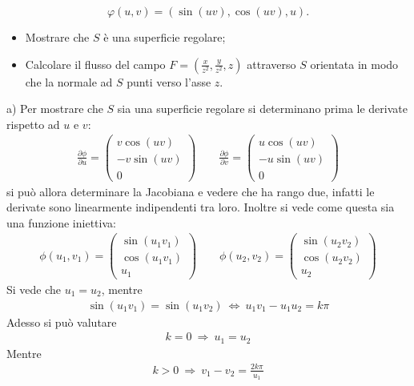 \documentclass[a4paper, oneside]{book}
\begin{document}
$$ \varphi(u,v) = (\sin(uv), \cos(uv), u). $$
\begin{itemize}
    \item[(a)] Mostrare che $S$ è una superficie regolare;
    \item[(b)] Calcolare il flusso del campo $F = \left( \frac{x}{z^2}, \frac{y}{z^2}, z \right)$ attraverso $S$ orientata in modo che la normale ad $S$ punti verso l'asse $z$.
\end{itemize}
a) Per mostrare che $S$ sia una superficie regolare si determinano prima le derivate 
rispetto ad $u$ e $v$:
\begin{gather*}
    \frac{\partial \phi}{\partial u} = \begin{pmatrix}
        v\cos(uv) \\
        -v\sin(uv) \\
        0
    \end{pmatrix} \qquad \frac{\partial \phi}{\partial v} = \begin{pmatrix}
        u\cos(uv) \\
        -u\sin(uv) \\
        0
    \end{pmatrix}  
\end{gather*}
si può allora determinare la Jacobiana e vedere che ha rango due, 
infatti le derivate sono linearmente indipendenti tra loro. Inoltre si vede
come questa sia una funzione iniettiva: 
\begin{gather*}
    \phi(u_1, v_1) = \begin{pmatrix}
        \sin(u_1v_1) \\
        \cos(u_1 v_1) \\
        u_1
    \end{pmatrix} \qquad \phi(u_2, v_2) = \begin{pmatrix}
        \sin(u_2 v_2) \\
        \cos(u_2 v_2) \\
        u_2
    \end{pmatrix}
\end{gather*}
Si vede che $u_1 = u_2$, mentre 
\begin{gather*}
    \sin(u_1 v_1) = \sin(u_1 v_2) \ \Longleftrightarrow \ u_1 v_1 - u_1 u_2 = k\pi
\end{gather*}
Adesso si può valutare
\begin{gather*}
    k = 0 \ \Longrightarrow \ u_1 = u_2 
\end{gather*}
Mentre
\begin{gather*}
    k > 0 \ \Longrightarrow \ v_1 - v_2 = \frac{2k\pi}{u_1}
\end{gather*}
\end{document}
